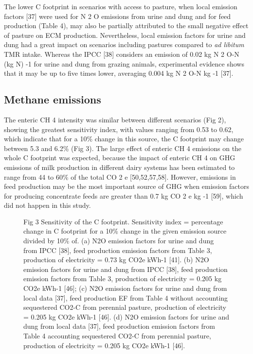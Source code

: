 \documentclass[11pt,a4paper]{article}
\begin{document}
The lower C footprint in scenarios with access to pasture, when local emission factors [37] were used for N 2 O emissions from urine and dung and for feed production (Table 4), may also be partially attributed to the small negative effect of pasture on ECM production. Nevertheless, local emission factors for urine and dung had a great impact on scenarios including pastures compared to \textit{ad libitum} TMR intake. Whereas the IPCC [38] considers an emission of 0.02 kg N 2 O-N (kg N) -1 for urine and dung from grazing animals, experimental evidence shows that it may be up to five times lower, averaging 0.004 kg N 2 O-N kg -1 [37].

\subsection{Methane emissions}

The enteric CH 4 intensity was similar between different scenarios (Fig 2), showing the greatest sensitivity index, with values ranging from 0.53 to 0.62, which indicate that for a 10\% change in this source, the C footprint may change between 5.3 and 6.2\% (Fig 3). The large effect of enteric CH 4 emissions on the whole C footprint was expected, because the impact of enteric CH 4 on GHG emissions of milk production in different dairy systems has been estimated to range from 44 to 60\% of the total CO 2 e [50,52,57,58]. However, emissions in feed production may be the most important source of GHG when emission factors for producing concentrate feeds are greater than 0.7 kg CO 2 e kg -1 [59], which did not happen in this study.

\begin{figure}[h]
\caption{Fig 3 Sensitivity of the C footprint. Sensitivity index = percentage change in C footprint for a 10\% change in the given emission source divided by 10\% of. (a) N2O emission factors for urine and dung from IPCC [38], feed production emission factors from Table 3, production of electricity = 0.73 kg CO2e kWh-1 [41]. (b) N2O emission factors for urine and dung from IPCC [38], feed production emission factors from Table 3, production of electricity = 0.205 kg CO2e kWh-1 [46]; (c) N2O emission factors for urine and dung from local data [37], feed production EF from Table 4 without accounting sequestered CO2-C from perennial pasture, production of electricity = 0.205 kg CO2e kWh-1 [46]. (d) N2O emission factors for urine and dung from local data [37], feed production emission factors from Table 4 accounting sequestered CO2-C from perennial pasture, production of electricity = 0.205 kg CO2e kWh-1 [46].}
\end{figure}
\end{document}
